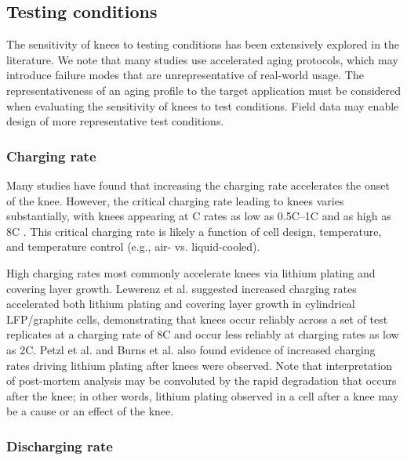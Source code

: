 \documentclass[journal=jpclcd,manuscript=article]{achemso}
\begin{document}
\subsection{Testing conditions}

The sensitivity of knees to testing conditions has been extensively explored in the literature.
We note that many studies use accelerated aging protocols, which may introduce failure modes that are unrepresentative of real-world usage.
The representativeness of an aging profile to the target application must be considered when evaluating the sensitivity of knees to test conditions.
Field data may enable design of more representative test conditions.\cite{sulzer_challenge_2021}

\subsubsection{Charging rate}
Many studies have found that increasing the charging rate accelerates the onset of the knee.\cite{lewerenz_systematic_2017,lewerenz_post-mortem_2017, petzl_lithium_2015, burns_-situ_2015, waldmann_optimization_2015, schuster_nonlinear_2015, severson_data-driven_2019, schindler_fast_2018, keil_linear_2019} However, the critical charging rate leading to knees varies substantially, with knees appearing at C rates as low as 0.5C--1C\cite{waldmann_optimization_2015, willenberg_development_2020} and as high as 8C \cite{lewerenz_systematic_2017}{}. This critical charging rate is likely a function of cell design, temperature, and temperature control (e.g., air- vs. liquid-cooled).

High charging rates most commonly accelerate knees via lithium plating and covering layer growth. Lewerenz et al.\cite{lewerenz_systematic_2017,lewerenz_post-mortem_2017} suggested increased charging rates accelerated both lithium plating and covering layer growth in cylindrical LFP/graphite cells, demonstrating that knees occur reliably across a set of test replicates at a charging rate of 8C and occur less reliably at charging rates as low as 2C. Petzl et al.\cite{petzl_lithium_2015} and Burns et al.\cite{burns_-situ_2015} also found evidence of increased charging rates driving lithium plating after knees were observed. Note that interpretation of post-mortem analysis may be convoluted by the rapid degradation that occurs after the knee; in other words, lithium plating observed in a cell after a knee may be a cause or an effect of the knee.

\subsubsection{Discharging rate}
\end{document}
